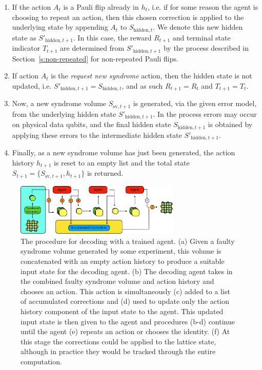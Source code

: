 \documentclass[twocolumn,preprintnumbers,amsmath,amssymb,notitlepage,nofootinbib,longbibliography,superscriptaddress,aps,pra,10pt]{revtex4-1}
\begin{document}
	\begin{enumerate}
		\item If the action $A_t$ is a Pauli flip already in $h_t$, i.e. if for some reason the agent is choosing to repeat an action, then this chosen correction is applied to the underlying state by appending $A_t$ to $S_{\mathrm{hidden},t}$.
		We denote this new hidden state as $S'_{\mathrm{hidden},t+1}$.
		In this case, the reward $R_{t+1}$ and terminal state indicator $T_{t+1}$ are determined from $S'_{\mathrm{hidden},t+1}$  by the process described in Section~\ref{s:non-repeated} for non-repeated Pauli flips.

		\item If action $A_t$ is the \emph{request new syndrome} action, then the hidden state is not updated, i.e. $S'_{\mathrm{hidden},t+1} = S_{\mathrm{hidden},t}$, and as such $R_{t+1} = R_{t}$ and $T_{t+1} = T_t$.

		\item Now, a new syndrome volume $S_{\mathrm{sv},t+1}$ is generated, via the given error model, from the underlying hidden state $S'_{\mathrm{hidden},t+1}$.
		In the process errors may occur on physical data qubits, and the final hidden state $S_{\mathrm{hidden},t+1}$ is obtained by applying these errors to the intermediate hidden state $S'_{\mathrm{hidden},t+1}$.

		\item Finally, as a new syndrome volume has just been generated, the action history $h_{t+1}$ is reset to an empty list and the total state $S_{t+1} = \{S_{\mathrm{sv},t+1},h_{t+1}\}$ is returned.
	\end{enumerate}

	\begin{figure}
		\centering
		\includegraphics[width=0.7\textwidth]{figures/agent_decoding.pdf}
		\caption{
			The procedure for decoding with a trained agent.
			(a) Given a faulty syndrome volume generated by some experiment, this volume is concatenated with an empty action history to produce a suitable input state for the decoding agent.
			(b) The decoding agent takes in the combined faulty syndrome volume and action history and chooses an action.
			This action is simultaneously (c) added to a list of accumulated corrections and (d) used to update only the action history component of the input state to the agent.
			This updated input state is then given to the agent and procedures (b-d) continue until the agent (e) repeats an action or chooses the identity.
			(f) At this stage the corrections could be applied to the lattice state, although in practice they would be tracked through the entire computation.
		}
		\label{agent_decoding}
	\end{figure}
\end{document}

